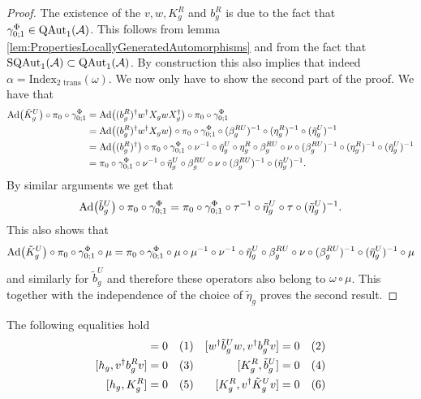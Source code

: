 \documentclass[12pt,a4paper,twoside]{article}
\numberwithin{equation}{section}
\begin{document}
\begin{proof}
	The existence of the $v,w,K_g^R$ and $b_g^R$ is due to the fact that $\gamma^\Phi_{0;1}\in \QAut{\AA}$. This follows from lemma \ref{lem:PropertiesLocallyGeneratedAutomorphisms} and from the fact that $\textrm{SQAut}_1(\AA)\subset \QAut{\AA}$. By construction this also implies that indeed $\alpha=\textrm{Index}_{\text{2 trans}}(\omega)$. We now only have to show the second part of the proof. We have that
	\begin{align}
		\Ad{\tilde{K}_g^U}\circ\pi_0\circ\gamma^\Phi_{0;1}&=\Ad{(b_g^R)^\dagger w^\dagger X_g w X_g^\dagger}\circ\pi_0\circ\gamma^\Phi_{0;1}\\
		&=\Ad{(b_g^R)^\dagger w^\dagger X_g w}\circ\pi_0\circ\gamma^\Phi_{0;1}\circ(\beta_g^{RU})^{-1}\circ(\eta_g^R)^{-1}\circ(\tilde{\eta}_g^U)^{-1}\\
		&=\Ad{(b_g^R)^\dagger}\circ\pi_0\circ\gamma^\Phi_{0;1}\circ\nu^{-1}\circ\tilde{\eta}_g^U\circ\eta_g^R\circ\beta_g^{RU}\circ\nu\circ(\beta_g^{RU})^{-1}\circ(\eta_g^R)^{-1}\circ(\tilde{\eta}_g^U)^{-1}\\
		&=\pi_0\circ\gamma^\Phi_{0;1}\circ\nu^{-1}\circ\tilde{\eta}_g^U\circ\beta_g^{RU}\circ\nu\circ(\beta_g^{RU})^{-1}\circ(\tilde{\eta}_g^U)^{-1}.
	\end{align}
	By similar arguments we get that
	\begin{equation}
		\Ad{\tilde{b}_g^U}\circ\pi_0\circ\gamma^\Phi_{0;1}=\pi_0\circ\gamma^\Phi_{0;1}\circ\tau^{-1}\circ\tilde{\eta}_g^U\circ\tau\circ(\tilde{\eta}_g^U)^{-1}.
	\end{equation}
	This also shows that
	\begin{equation}
		\Ad{\tilde{K}_g^U}\circ\pi_0\circ\gamma^\Phi_{0;1}\circ\mu=\pi_0\circ\gamma^\Phi_{0;1}\circ\mu\circ\mu^{-1}\circ\nu^{-1}\circ\tilde{\eta}_g^U\circ\beta_g^{RU}\circ\nu\circ(\beta_g^{RU})^{-1}\circ(\tilde{\eta}_g^U)^{-1}\circ\mu
	\end{equation}
	and similarly for $\tilde{b}_g^U$ and therefore these operators also belong to $\omega\circ\mu$. This together with the independence of the choice of $\tilde{\eta}_g$ proves the second result.
\end{proof}
\begin{lemma}
	The following equalities hold
	\begin{align*}
		[h_g ,w^\dagger \tilde{b}_g^U w]&=0 \Label{eq:H^1IndexRotationInvariantCommutator1}& [w^\dagger \tilde{b}_g^U w,v^\dagger b_g^R v]&=0 \Label{eq:H^1IndexRotationInvariantCommutator4}\\
		[h_g, v^\dagger b_g^R v]&=0 \Label{eq:H^1IndexRotationInvariantCommutator2}& [K_g^R,\tilde{b}_g^U] &= 0 \Label{eq:H^1IndexRotationInvariantCommutator5}\\
		[h_g ,K_g^R]&=0 \Label{eq:H^1IndexRotationInvariantCommutator3}& [K_g^R,v^\dagger \tilde{K}^U_g v] &= 0 \Label{eq:H^1IndexRotationInvariantCommutator6}
	\end{align*}
\end{lemma}
\end{document}

